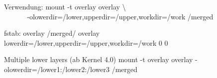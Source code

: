 \documentclass[11pt]{beamer}
\begin{document}
\begin{frame}
\begin{block}{Verwendung:}\footnotesize
mount -t overlay overlay \textbackslash \\ $\qquad\quad$
-olowerdir=/lower,upperdir=/upper,workdir=/work /merged
\end{block}
\vfill

\begin{block}{fstab:}\footnotesize
overlay /merged/ overlay lowerdir=/lower,upperdir=/upper,workdir=/work 0 0
\end{block}
\vfill

\begin{block}{Multiple lower layers (ab Kernel 4.0)}\footnotesize
mount -t overlay overlay -olowerdir=/lower1:/lower2:/lower3 /merged
\end{block}
\end{frame}
\end{document}
